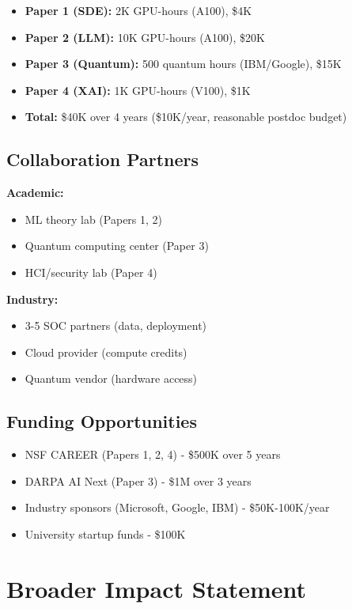 \documentclass[11pt,letterpaper]{article}
\begin{document}
\begin{itemize}
\item \textbf{Paper 1 (SDE):} 2K GPU-hours (A100), \$4K
\item \textbf{Paper 2 (LLM):} 10K GPU-hours (A100), \$20K
\item \textbf{Paper 3 (Quantum):} 500 quantum hours (IBM/Google), \$15K
\item \textbf{Paper 4 (XAI):} 1K GPU-hours (V100), \$1K
\item \textbf{Total:} \$40K over 4 years (\$10K/year, reasonable postdoc budget)
\end{itemize}

\subsection{Collaboration Partners}

\textbf{Academic:}
\begin{itemize}
\item ML theory lab (Papers 1, 2)
\item Quantum computing center (Paper 3)
\item HCI/security lab (Paper 4)
\end{itemize}

\textbf{Industry:}
\begin{itemize}
\item 3-5 SOC partners (data, deployment)
\item Cloud provider (compute credits)
\item Quantum vendor (hardware access)
\end{itemize}

\subsection{Funding Opportunities}

\begin{itemize}
\item NSF CAREER (Papers 1, 2, 4) - \$500K over 5 years
\item DARPA AI Next (Paper 3) - \$1M over 3 years
\item Industry sponsors (Microsoft, Google, IBM) - \$50K-100K/year
\item University startup funds - \$100K
\end{itemize}

\section{Broader Impact Statement}
\end{document}
